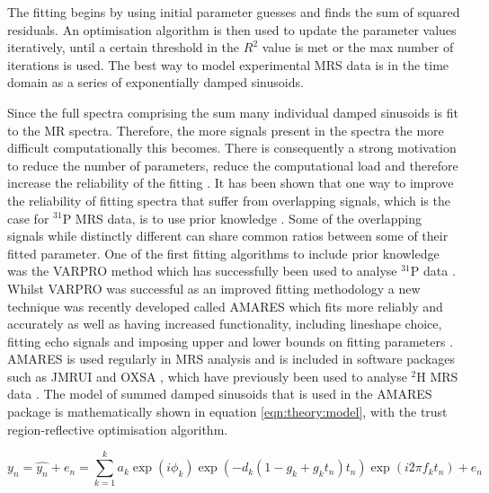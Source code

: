 \noindent The fitting begins by using initial parameter guesses and finds the sum of squared residuals. An optimisation algorithm is then used to update the parameter values iteratively, until a certain threshold in the $R^2$ value is met or the max number of iterations is used. The best way to model experimental \ac{MRS} data is in the time domain as a series of exponentially damped sinusoids. 

Since the full spectra comprising the sum many individual damped sinusoids is fit to the MR spectra. Therefore, the more signals present in the spectra the more difficult computationally this becomes. There is consequently a strong motivation to reduce the number of parameters, reduce the computational load and therefore increase the reliability of the fitting \cite{Near2021PreprocessingRecommendations}. It has been shown that one way to improve the reliability of fitting spectra that suffer from overlapping signals, which is the case for $^{31}$P \ac{MRS} data, is to use prior knowledge \cite{Hamilton2003PriorSpectra}. Some of the overlapping signals while distinctly different can share common ratios between some of their fitted parameter. One of the first fitting algorithms to include prior knowledge was the \ac{VARPRO} method \cite{Golub1973TheSeparate} which has successfully been used to analyse $^{31}$P data \cite{vanderVeen1988AccurateKnowledge,Stubbs199631P-MagneticADP}. Whilst \ac{VARPRO} was successful as an improved fitting methodology a new technique was recently developed called \ac{AMARES} which fits more reliably and accurately as well as having increased functionality, including lineshape choice, fitting echo signals and imposing upper and lower bounds on fitting parameters \cite{Vanhamme1997ImprovedKnowledge}. \ac{AMARES} is used regularly in \ac{MRS} analysis and is included in software packages such as JMRUI \cite{Stefan2009QuantitationPackage} and OXSA \cite{Purvis2017OXSA:MATLAB}, which have previously been used to analyse $^2$H \ac{MRS} data \cite{Simoes2022GlucoseGlioblastoma,Kreis2020MeasuringMRI,Kaggie2022DeuteriumMetabolism}. The model of summed damped sinusoids that is used in the \ac{AMARES} package is mathematically shown in equation \ref{eqn:theory:model}, with the trust region-reflective optimisation algorithm.

\begin{equation}
    y_n = \hat{y_n} + e_n = \sum_{k=1}^{k}a_k\exp(i\phi_k)\exp(-d_k(1-g_k+g_kt_n)t_n)\exp(i2\pi f_kt_n) + e_n
    \label{eqn:theory:model}
\end{equation}

